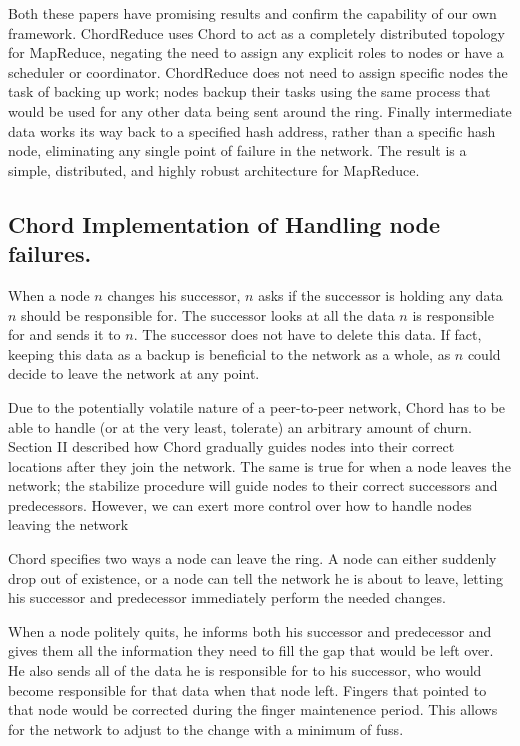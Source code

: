 \documentclass[conference, compsocconf, letterpaper]{IEEEtran}
\begin{document}
Both these papers have promising results and confirm the capability of our own framework.  ChordReduce uses Chord to act as a completely distributed topology for MapReduce, negating the need to assign any explicit roles to nodes or have a scheduler or coordinator.  ChordReduce does not need to assign specific nodes the task of backing up work; nodes backup their tasks using the same process that would be used for any other data being sent around the ring.  Finally intermediate data works its way back to a specified hash address, rather than a specific hash node, eliminating any single point of failure in the network.  The result is a simple, distributed, and highly robust architecture for MapReduce.


\subsection{Chord Implementation of Handling node failures.}
When a node $n$ changes his successor, $n$ asks if the successor is holding any data $n$ should be responsible for.  The successor looks at all the data $n$ is responsible for and sends it  to $n$.  The successor does not have to delete this data. If fact, keeping this data as a backup is beneficial to the network as a whole, as $n$ could decide to leave the network at any point. 

Due to the potentially volatile nature of a peer-to-peer network, Chord has to be able to handle (or at the very least, tolerate) an arbitrary amount of churn.  Section II described how Chord gradually guides nodes into their correct locations after they join the network.  The same is true for when a node leaves the network; the stabilize procedure will guide nodes to their correct successors and predecessors.  However, we can exert more control over how to handle nodes leaving the network

Chord specifies two ways a node can leave the ring.  A node can either suddenly drop out of existence, or a node can tell the network he is about to leave, letting his successor and predecessor immediately perform the needed changes.

When a node politely quits, he informs both his successor and predecessor and gives them all the information they need to fill the gap that would be left over. He also sends all of the data he is responsible for to his successor, who would become responsible for that data when that node left.  Fingers that pointed to that node would be corrected during the finger maintenence period.  This allows for the network to adjust to the change with a minimum of fuss.
\end{document}
